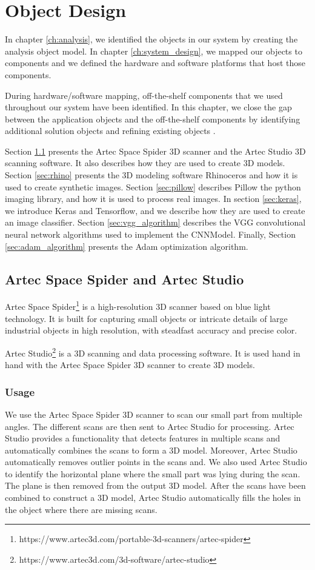 \chapter{Object Design}\label{ch:object_design}
In chapter \ref{ch:analysis}, we identified the objects in our system by creating the analysis object model. In chapter \ref{ch:system_design}, we mapped our objects to components and we defined the hardware and software platforms that host those components.

During hardware/software mapping, off-the-shelf components that we used throughout our system have been identified. In this chapter, we close the gap between the application objects and the off-the-shelf components by identifying additional solution objects and refining existing objects \cite{bruegge2004object}.

Section \ref{sec:artec} presents the Artec Space Spider 3D scanner and the Artec Studio 3D scanning software. It also describes how they are used to create 3D models. Section \ref{sec:rhino} presents the 3D modeling software Rhinoceros and how it is used to create synthetic images. Section \ref{sec:pillow} describes Pillow the python imaging library, and how it is used to process real images. In section \ref{sec:keras}, we introduce Keras and Tensorflow, and we describe how they are used to create an image classifier. Section \ref{sec:vgg_algorithm} describes the VGG convolutional neural network algorithms used to implement the CNNModel. Finally, Section \ref{sec:adam_algorithm} presents the Adam optimization algorithm.


\section{Artec Space Spider and Artec Studio}\label{sec:artec}
Artec Space Spider\footnote{https://www.artec3d.com/portable-3d-scanners/artec-spider} is a high-resolution 3D scanner based on blue light technology. It is built for capturing small objects or intricate details of large industrial objects in high resolution, with steadfast accuracy and precise color.

Artec Studio\footnote{https://www.artec3d.com/3d-software/artec-studio} is a 3D scanning and data processing software. It is used hand in hand with the Artec Space Spider 3D scanner to create 3D models.

\subsection{Usage}
We use the Artec Space Spider 3D scanner to scan our small part from multiple angles. The different scans are then sent to Artec Studio for processing. Artec Studio provides a functionality that detects features in multiple scans and automatically combines the scans to form a 3D model. Moreover, Artec Studio automatically removes outlier points in the scans and. We also used Artec Studio to identify the horizontal plane where the small part was lying during the scan. The plane is then removed from the output 3D model. After the scans have been combined to construct a 3D model, Artec Studio automatically fills the holes in the object where there are missing scans.


